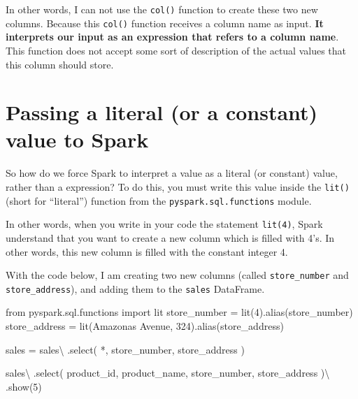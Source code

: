 \documentclass[
  11pt,
  letterpaper,
  DIV=11,
  numbers=noendperiod]{scrreprt}
\newenvironment{Shaded}{\begin{snugshade}}{\end{snugshade}}
\newcommand{\DecValTok}[1]{\textcolor[rgb]{0.68,0.00,0.00}{#1}}
\newcommand{\ImportTok}[1]{\textcolor[rgb]{0.00,0.46,0.62}{#1}}
\newcommand{\NormalTok}[1]{\textcolor[rgb]{0.00,0.23,0.31}{#1}}
\newcommand{\OperatorTok}[1]{\textcolor[rgb]{0.37,0.37,0.37}{#1}}
\newcommand{\StringTok}[1]{\textcolor[rgb]{0.13,0.47,0.30}{#1}}
\begin{document}
In other words, I can not use the \texttt{col()} function to create
these two new columns. Because this \texttt{col()} function receives a
column name as input. \textbf{It interprets our input as an expression
that refers to a column name}. This function does not accept some sort
of description of the actual values that this column should store.

\section{Passing a literal (or a constant) value to
Spark}\label{sec-literal-values}

So how do we force Spark to interpret a value as a literal (or constant)
value, rather than a expression? To do this, you must write this value
inside the \texttt{lit()} (short for ``literal'') function from the
\texttt{pyspark.sql.functions} module.

In other words, when you write in your code the statement
\texttt{lit(4)}, Spark understand that you want to create a new column
which is filled with 4's. In other words, this new column is filled with
the constant integer 4.

With the code below, I am creating two new columns (called
\texttt{store\_number} and \texttt{store\_address}), and adding them to
the \texttt{sales} DataFrame.

\begin{Shaded}
\begin{Highlighting}[]
\ImportTok{from}\NormalTok{ pyspark.sql.functions }\ImportTok{import}\NormalTok{ lit}
\NormalTok{store\_number }\OperatorTok{=}\NormalTok{ lit(}\DecValTok{4}\NormalTok{).alias(}\StringTok{\textquotesingle{}store\_number\textquotesingle{}}\NormalTok{)}
\NormalTok{store\_address }\OperatorTok{=}\NormalTok{ lit(}\StringTok{\textquotesingle{}Amazonas Avenue, 324\textquotesingle{}}\NormalTok{).alias(}\StringTok{\textquotesingle{}store\_address\textquotesingle{}}\NormalTok{)}

\NormalTok{sales }\OperatorTok{=}\NormalTok{ sales}\OperatorTok{\textbackslash{}}
\NormalTok{    .select(}
        \StringTok{\textquotesingle{}*\textquotesingle{}}\NormalTok{, store\_number, store\_address}
\NormalTok{    )}

\NormalTok{sales}\OperatorTok{\textbackslash{}}
\NormalTok{    .select(}
        \StringTok{\textquotesingle{}product\_id\textquotesingle{}}\NormalTok{, }\StringTok{\textquotesingle{}product\_name\textquotesingle{}}\NormalTok{,}
        \StringTok{\textquotesingle{}store\_number\textquotesingle{}}\NormalTok{, }\StringTok{\textquotesingle{}store\_address\textquotesingle{}}
\NormalTok{    )}\OperatorTok{\textbackslash{}}
\NormalTok{    .show(}\DecValTok{5}\NormalTok{)}
\end{Highlighting}
\end{Shaded}
\end{document}
